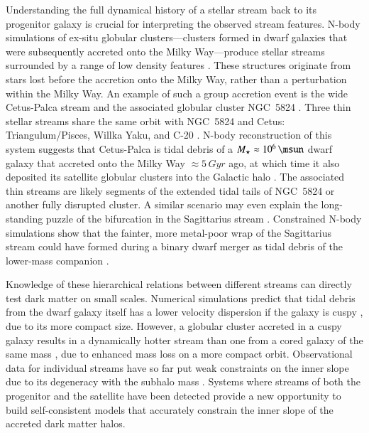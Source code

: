 \documentclass[final,5p,times,twocolumn,authoryear]{elsarticle}
\begin{document}
Understanding the full dynamical history of a stellar stream back to its progenitor galaxy is crucial for interpreting the observed stream features.
N-body simulations of ex-situ globular clusters---clusters formed in dwarf galaxies that were subsequently accreted onto the Milky Way---produce stellar streams surrounded by a range of low density features \citep[e.g., wide envelopes, or cocoons, and/or sub-streams;][]{carlberg:2018,carlberg:2020,malhan:2019a,qian:2022}.
These structures originate from stars lost before the accretion onto the Milky Way, rather than a perturbation within the Milky Way.
An example of such a group accretion event is the wide Cetus-Palca stream and the associated globular cluster NGC~5824 \citep{yuan:2019,thomas:2022}.
Three thin stellar streams share the same orbit with NGC~5824 and Cetus: Triangulum/Pisces, Willka Yaku, and C-20 \citep{bonaca:2021, yuan:2022}.
N-body reconstruction of this system suggests that Cetus-Palca is tidal debris of a $M_\star\approx10^6\,\unit{\msun}$ dwarf galaxy that accreted onto the Milky Way $\approx5\,\unit{Gyr}$ ago, at which time it also deposited its satellite globular clusters into the Galactic halo \citep{chang:2020}.
The associated thin streams are likely segments of the extended tidal tails of NGC~5824 or another fully disrupted cluster.
A similar scenario may even explain the long-standing puzzle of the bifurcation in the Sagittarius stream \citep{belokurov:2006, koposov:2012}.
Constrained N-body simulations show that the fainter, more metal-poor wrap of the Sagittarius stream \citep[e.g.,][]{ramos:2022} could have formed during a binary dwarf merger as tidal debris of the lower-mass companion \citep{davies:2024a,davies:2024b}.

Knowledge of these hierarchical relations between different streams can directly test dark matter on small scales.
Numerical simulations predict that tidal debris from the dwarf galaxy itself has a lower velocity dispersion if the galaxy is cuspy \citep{errani:2015}, due to its more compact size.
However, a globular cluster accreted in a cuspy galaxy results in a dynamically hotter stream than one from a cored galaxy of the same mass \citep{malhan:2021}, due to enhanced mass loss on a more compact orbit.
Observational data for individual streams have so far put weak constraints on the inner slope due to its degeneracy with the subhalo mass \citep{malhan:2022b}.
Systems where streams of both the progenitor and the satellite have been detected provide a new opportunity to build self-consistent models that accurately constrain the inner slope of the accreted dark matter halos.
\end{document}
